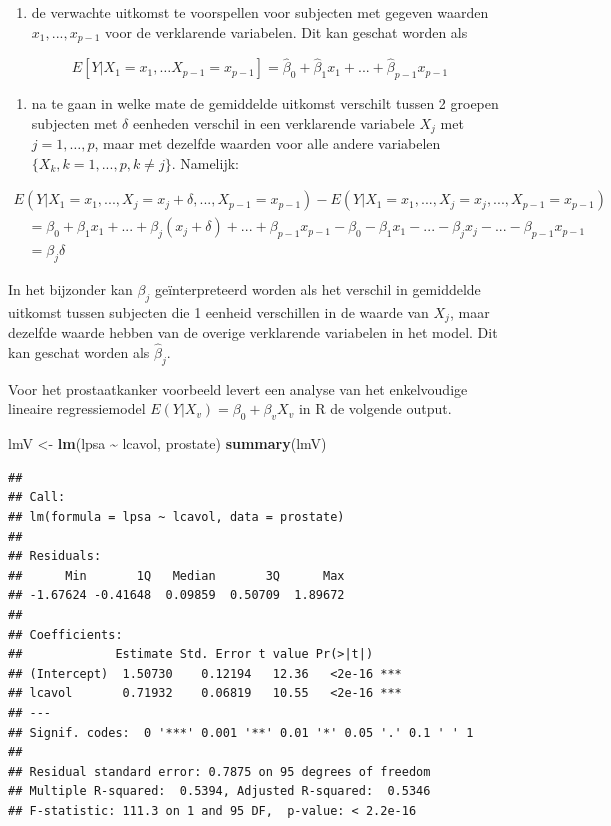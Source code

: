 \documentclass[
  12pt,dutch]{book}
\newenvironment{Shaded}{\begin{snugshade}}{\end{snugshade}}
\newcommand{\FunctionTok}[1]{\textcolor[rgb]{0.13,0.29,0.53}{\textbf{#1}}}
\newcommand{\NormalTok}[1]{#1}
\newcommand{\OtherTok}[1]{\textcolor[rgb]{0.56,0.35,0.01}{#1}}
\newcommand{\SpecialCharTok}[1]{\textcolor[rgb]{0.81,0.36,0.00}{\textbf{#1}}}
\providecommand{\tightlist}{%
  \setlength{\itemsep}{0pt}\setlength{\parskip}{0pt}}
\theoremstyle{definition}
\theoremstyle{definition}
\theoremstyle{definition}
\theoremstyle{definition}
\theoremstyle{remark}
\begin{document}
\begin{enumerate}
\def\labelenumi{\arabic{enumi}.}
\tightlist
\item
  de verwachte uitkomst te voorspellen voor subjecten met gegeven
  waarden \(x_1,...,x_{p-1}\) voor de verklarende variabelen.
  Dit kan geschat worden als
\end{enumerate}

\[
E[Y\vert X_1=x_1, \ldots X_{p-1}=x_{p-1}]=\hat{\beta}_0+\hat{\beta}_1x_1+...+\hat{\beta}_{p-1}x_{p-1}
\]

\begin{enumerate}
\def\labelenumi{\arabic{enumi}.}
\setcounter{enumi}{1}
\tightlist
\item
  na te gaan in welke mate de gemiddelde uitkomst verschilt tussen 2 groepen subjecten met \(\delta\) eenheden verschil in een verklarende variabele \(X_j\) met \(j=1,\ldots,p\), maar met dezelfde waarden voor alle andere variabelen \(\{X_k,k=1,...,p,k\ne j\}\).
  Namelijk:
\end{enumerate}

\[
\begin{array}{l}
E(Y|X_1=x_1,...,X_j=x_j+\delta,...,X_{p-1}=x_{p-1}) - E(Y|X_1=x_1,...,X_j=x_j,...,X_{p-1}=x_{p-1}) \\
\quad =\beta_0 + \beta_1 x_1 + ... + \beta_j(x_j+\delta)+...+\beta_{p-1} x_{p-1} - \beta_0 - \beta_1 x_1 - ... - \beta_jx_j-...-\beta_{p-1} x_{p-1} \\
\quad= \beta_j\delta
\end{array}
\]

In het bijzonder kan \(\beta_j\) geïnterpreteerd worden als het verschil in gemiddelde uitkomst tussen subjecten die 1 eenheid verschillen in de
waarde van \(X_j\), maar dezelfde waarde hebben van de overige verklarende variabelen in het model. Dit kan geschat worden als \(\hat{\beta}_j\).

Voor het prostaatkanker voorbeeld levert een analyse van het enkelvoudige lineaire regressiemodel \(E(Y|X_v)=\beta_0+\beta_v X_v\) in R de volgende output.

\begin{Shaded}
\begin{Highlighting}[]
\NormalTok{lmV }\OtherTok{\textless{}{-}} \FunctionTok{lm}\NormalTok{(lpsa }\SpecialCharTok{\textasciitilde{}}\NormalTok{ lcavol, prostate)}
\FunctionTok{summary}\NormalTok{(lmV)}
\end{Highlighting}
\end{Shaded}

\begin{verbatim}
## 
## Call:
## lm(formula = lpsa ~ lcavol, data = prostate)
## 
## Residuals:
##      Min       1Q   Median       3Q      Max 
## -1.67624 -0.41648  0.09859  0.50709  1.89672 
## 
## Coefficients:
##             Estimate Std. Error t value Pr(>|t|)    
## (Intercept)  1.50730    0.12194   12.36   <2e-16 ***
## lcavol       0.71932    0.06819   10.55   <2e-16 ***
## ---
## Signif. codes:  0 '***' 0.001 '**' 0.01 '*' 0.05 '.' 0.1 ' ' 1
## 
## Residual standard error: 0.7875 on 95 degrees of freedom
## Multiple R-squared:  0.5394, Adjusted R-squared:  0.5346 
## F-statistic: 111.3 on 1 and 95 DF,  p-value: < 2.2e-16
\end{verbatim}
\end{document}
